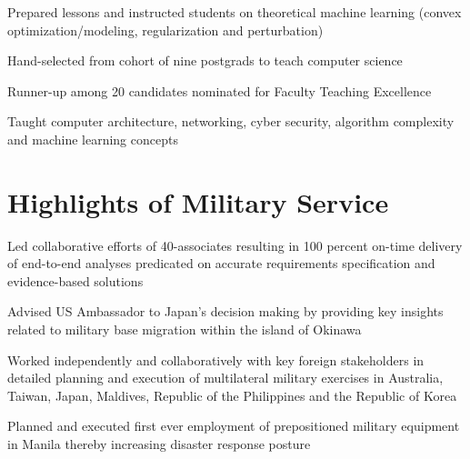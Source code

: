 \documentclass[]{Forester-Resume}
\begin{document}
\begin{minipage}[t]{0.66\textwidth}
\begin{tightemize}
\end{tightemize}

\sectionsep
{}

\begin{tightemize}

\item Prepared lessons and instructed students on theoretical machine learning (convex optimization/modeling, regularization and perturbation)

\item Hand-selected from cohort of nine postgrads to teach computer science

\item Runner-up among 20 candidates nominated for Faculty Teaching Excellence

\item Taught computer architecture, networking, cyber security, algorithm complexity and machine learning concepts

\end{tightemize}

\section{Highlights of Military Service}

\begin{tightemize}

\item Led collaborative efforts of 40-associates resulting in 100 percent on-time delivery of end-to-end analyses predicated on accurate requirements specification and evidence-based solutions

\item Advised US Ambassador to Japan's decision making by providing key insights related to military base migration within the island of Okinawa 

\item Worked independently and collaboratively with key foreign stakeholders in detailed planning and execution of multilateral military exercises in Australia, Taiwan, Japan, Maldives, Republic of the Philippines and the Republic of Korea

\item Planned and executed first ever employment of prepositioned military equipment in Manila thereby increasing disaster response posture


\end{tightemize}
\end{minipage}
\end{document}
